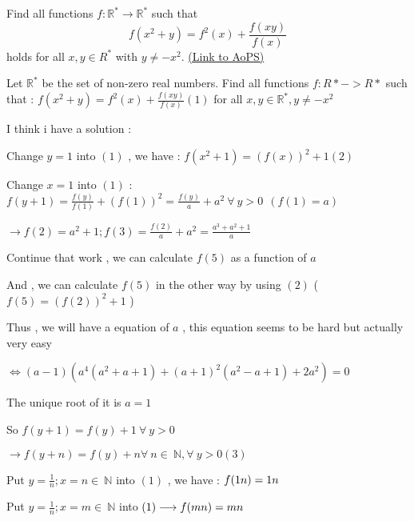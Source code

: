 \begin{problem}
	Find all functions $ f : \mathbb R^* \to \mathbb R^*$ such that \[ f(x^2 + y) = f^2(x) + \frac {f(xy)}{f(x)}\] holds for all $x, y \in R^*$ with $y \neq -x^2$.
	\flushright \href{https://artofproblemsolving.com/community/c6h300486}{(Link to AoPS)}
\end{problem}



\begin{solution}
	\begin{tcolorbox}Let $ \mathbb{R^{*}}$ be the set of non-zero real numbers. Find all functions $ f : R* - > R*$ such that : $ f(x^2 + y) = f^2(x) + \frac {f(xy)}{f(x)} (1)$
for all $ x, y \in \mathbb{R^{*}}, y \neq - x^{2}$\end{tcolorbox}

 \begin{italicized}  I think i have a solution :  

Change $ y = 1$ into $ (1)$ , we have : $ f(x^2 + 1 ) = (f(x))^2 + 1 (2)$

 Change $ x = 1$ into $ (1)$ : $ f(y + 1) = \frac {f(y)}{f(1)} + (f(1))^2 = \frac {f(y)}{a} + a^2 \ \forall \ y > 0 \ \ ( f(1) = a)$

$ \longrightarrow f(2) = a^2 + 1 ; f(3) = \frac {f(2)}{a} + a^2 = \frac {a^3 + a^2 + 1}{a}$

  Continue that work , we can calculate $ f(5)$ as a function of $ a$

   And , we can calculate $ f(5)$ in the other way by using  $ (2)$ ( $ f(5) = (f(2))^2 + 1$ )

  Thus , we will have a equation of $ a$ , this equation seems to be hard but actually very easy 
     
 $ \iff (a - 1) \left( a^4 (a^2 + a + 1) + (a + 1)^2 (a^2 - a + 1) + 2a^2 \right) = 0$  

The unique root of it is $ a = 1$

   So $ f(y + 1) = f(y) + 1 \ \forall \ y > 0$

  $ \longrightarrow f(y + n) = f(y) + n \forall \ n \in \ \mathbb{N} , \forall \ y > 0 (3)$

  Put $ y = \frac {1}{n} ; x = n \in \ \mathbb{N}$ into $ (1)$ , we have : $ f(1\/n) = 1\/n$

Put $ y = \frac {1}{n} ; x = m \in \ \mathbb{N}$ into $ (1) \longrightarrow f( m\/n) = m\/n$


\end{italicized}
\end{solution}
